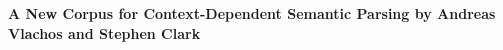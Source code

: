 \vspace{1ex}
\item[] {\bfseries A New Corpus for Context-Dependent Semantic Parsing by Andreas Vlachos and Stephen Clark
}
\item[$\bullet$] 
\item[$\bullet$] 
